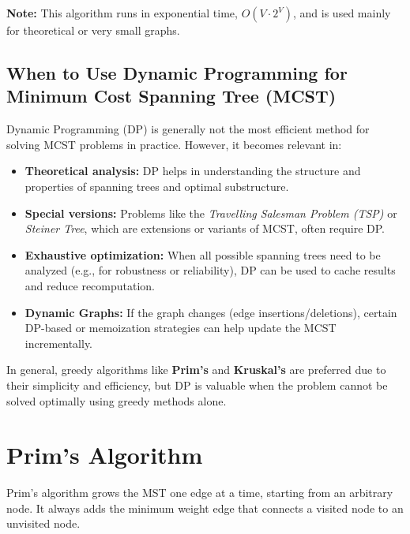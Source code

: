 \documentclass[14pt,a4paper]{extarticle}
\begin{document}
\vspace{1em}
\textbf{Note:} This algorithm runs in exponential time, \(O(V \cdot 2^V)\), and is used mainly for theoretical or very small graphs.

\newpage
\subsection{When to Use Dynamic Programming for Minimum Cost Spanning Tree (MCST)}

Dynamic Programming (DP) is generally not the most efficient method for solving MCST problems in practice. However, it becomes relevant in:

\begin{itemize}
    \item \textbf{Theoretical analysis:} DP helps in understanding the structure and properties of spanning trees and optimal substructure.
    \item \textbf{Special versions:} Problems like the \textit{Travelling Salesman Problem (TSP)} or \textit{Steiner Tree}, which are extensions or variants of MCST, often require DP.
    \item \textbf{Exhaustive optimization:} When all possible spanning trees need to be analyzed (e.g., for robustness or reliability), DP can be used to cache results and reduce recomputation.
    \item \textbf{Dynamic Graphs:} If the graph changes (edge insertions/deletions), certain DP-based or memoization strategies can help update the MCST incrementally.
\end{itemize}

\noindent
In general, greedy algorithms like \textbf{Prim’s} and \textbf{Kruskal’s} are preferred due to their simplicity and efficiency, but DP is valuable when the problem cannot be solved optimally using greedy methods alone.


\newpage
\section{Prim's Algorithm}

Prim's\cite{prim1957} algorithm grows the MST one edge at a time, starting from an arbitrary node. 
It always adds the minimum weight edge that connects a visited node to an unvisited node.
\end{document}
